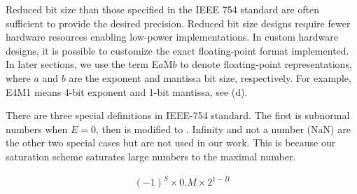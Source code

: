Reduced bit size than those specified in the IEEE 754 standard are often sufficient to provide the desired precision. Reduced bit size designs require fewer hardware resources enabling low-power implementations. In custom hardware designs, it is possible to customize the exact floating-point format implemented. In later sections, we use the term E$a$M$b$ to denote floating-point representations, where $a$ and $b$ are the exponent and mantissa bit size, respectively. For example, E4M1 means 4-bit exponent and 1-bit mantissa, see (d).

There are three special definitions in IEEE-754 standard. The first is subnormal numbers when $E=0$, then  is modified to . Infinity and not a number (NaN) are the other two special cases but are not used in our work. This is because our saturation scheme saturates large numbers to the maximal number.

\begin{eqnarray} \label{eq:float_subnorm}
(-1)^{S} \times 0.M \times 2^{1-B}
\end{eqnarray}